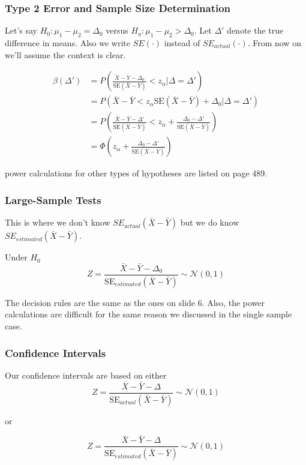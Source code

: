 \documentclass{beamer}
\begin{document}
\begin{frame}
\frametitle{Type 2 Error and Sample Size Determination}

Let's say $H_0: \mu_1 - \mu_2 = \Delta_0$ versus $H_a: \mu_1 - \mu_2 > \Delta_0$. Let $\Delta'$ denote the true difference in means. Also we write $SE(\cdot)$ instead of $SE_{actual}(\cdot)$. From now on we'll assume the context is clear.
\newline

\begin{align*}
\beta(\Delta') &= P\left( \frac{\bar{X} - \bar{Y} - \Delta_0}{\text{SE}(\bar{X} - \bar{Y})} < z_{\alpha}  | \Delta = \Delta' \right) \\
&= P\left( \bar{X} - \bar{Y}   < z_{\alpha}\text{SE}(\bar{X} - \bar{Y}) + \Delta_0  | \Delta = \Delta' \right) \\
&= P\left( \frac{\bar{X} - \bar{Y} - \Delta'}{\text{SE}(\bar{X} - \bar{Y})} < z_{\alpha} + \frac{\Delta_0 - \Delta'}{\text{SE}(\bar{X} - \bar{Y})} \right) \\
&= \Phi\left( z_{\alpha} + \frac{\Delta_0 - \Delta'}{\text{SE}(\bar{X} - \bar{Y})} \right)
\end{align*}

power calculations for other types of hypotheses are listed on page 489.
\end{frame}
\begin{frame}
\frametitle{Large-Sample Tests}

This is where we don't know $SE_{actual}(\bar{X} - \bar{Y})$ but we do know $SE_{estimated}(\bar{X} - \bar{Y})$.
\newline

Under $H_0$
\[
Z = \frac{\bar{X} - \bar{Y} - \Delta_0}{\text{SE}_{estimated}(\bar{X} - \bar{Y})} \sim \mathcal{N}(0,1)
\]

The decision rules are the same as the ones on slide 6. Also, the power calculations are difficult for the same reason we discussed in the single sample case. 
\end{frame}
\begin{frame}
\frametitle{Confidence Intervals}
Our confidence intervals are based on either 
\[
Z = \frac{\bar{X} - \bar{Y} - \Delta}{\text{SE}_{actual}(\bar{X} - \bar{Y})} \sim \mathcal{N}(0,1)
\]

or

\[
Z = \frac{\bar{X} - \bar{Y} - \Delta}{\text{SE}_{estimated}(\bar{X} - \bar{Y})} \sim \mathcal{N}(0,1)
\]


\end{frame}
\end{document}
